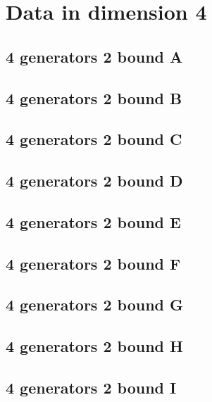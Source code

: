 \documentclass{TC}
\begin{document}
{
\singlespacing
\section{Data in dimension 4}
\subsection{4 generators 2 bound A}

\newpage

\subsection{4 generators 2 bound B}

\newpage

\subsection{4 generators 2 bound C}

\newpage

\subsection{4 generators 2 bound D}

\newpage

\subsection{4 generators 2 bound E}

\newpage

\subsection{4 generators 2 bound F}

\newpage

\subsection{4 generators 2 bound G}

\newpage

\subsection{4 generators 2 bound H}

\newpage

\subsection{4 generators 2 bound I}

\newpage

}
\end{document}
